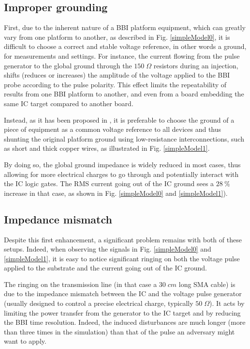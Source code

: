 \documentclass[10pt, conference, compsocconf]{IEEEtran}
\begin{document}
\subsection{Improper grounding}
First, due to the inherent nature of a BBI platform equipment, which can greatly vary from one platform to another, as described in Fig. \ref{simpleModel0}, it is difficult to choose a correct and stable voltage reference, in other words a ground, for measurements and settings.
For instance, the current flowing from the pulse generator to the global ground through the $150 \; \Omega$ resistors during an injection, shifts (reduces or increases) the amplitude of the voltage applied to the BBI probe according to the pulse polarity.
This effect limits the repeatability of results from one BBI platform to another, and even from a board embedding the same IC target compared to another board.

Instead, as it has been proposed in \cite{mybbi2}, it is preferable to choose the ground of a piece of equipment as a common voltage reference to all devices and thus shunting the original platform ground using low-resistance interconnections, such as short and thick copper wires, as illustrated in Fig. \ref{simpleModel1}.

By doing so, the global ground impedance is widely reduced in most cases, thus allowing for more electrical charges to go through and potentially interact with the IC logic gates.
The RMS current going out of the IC ground sees a $28 \: \%$ increase in that case, as shown in Fig. \ref{simpleModel0} and \ref{simpleModel1}).

\subsection{Impedance mismatch}
Despite this first enhancement, a significant problem remains with both of these setups.
Indeed, when observing the signals in Fig. \ref{simpleModel0} and \ref{simpleModel1}, it is easy to notice significant ringing on both the voltage pulse applied to the substrate and the current going out of the IC ground.

The ringing on the transmission line (in that case a $30 \; cm$ long SMA cable) is due to the impedance mismatch between the IC and the voltage pulse generator (usually designed to control a precise electrical charge, typically $50 \; \Omega$).
It acts by limiting the power transfer from the generator to the IC target and by reducing the BBI time resolution.
Indeed, the induced disturbances are much longer (more than three times in the simulation) than that of the pulse an adversary might want to apply.
\end{document}

